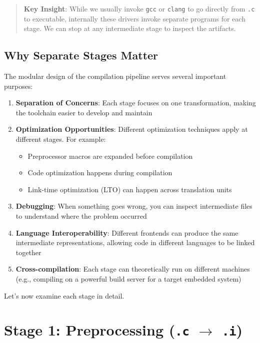 \begin{quote}
\textbf{Key Insight}: While we usually invoke \texttt{gcc} or \texttt{clang} to go directly from \texttt{.c} to executable, internally these drivers invoke separate programs for each stage. We can stop at any intermediate stage to inspect the artifacts.
\end{quote}

\subsection{Why Separate Stages Matter}

The modular design of the compilation pipeline serves several important purposes:

\begin{enumerate}
    \item \textbf{Separation of Concerns}: Each stage focuses on one transformation, making the toolchain easier to develop and maintain

    \item \textbf{Optimization Opportunities}: Different optimization techniques apply at different stages. For example:
    \begin{itemize}
        \item Preprocessor macros are expanded before compilation
        \item Code optimization happens during compilation
        \item Link-time optimization (LTO) can happen across translation units
    \end{itemize}

    \item \textbf{Debugging}: When something goes wrong, you can inspect intermediate files to understand where the problem occurred

    \item \textbf{Language Interoperability}: Different frontends can produce the same intermediate representations, allowing code in different languages to be linked together

    \item \textbf{Cross-compilation}: Each stage can theoretically run on different machines (e.g., compiling on a powerful build server for a target embedded system)
\end{enumerate}

Let's now examine each stage in detail.

\section{Stage 1: Preprocessing (\texttt{.c} $\to$ \texttt{.i})}

